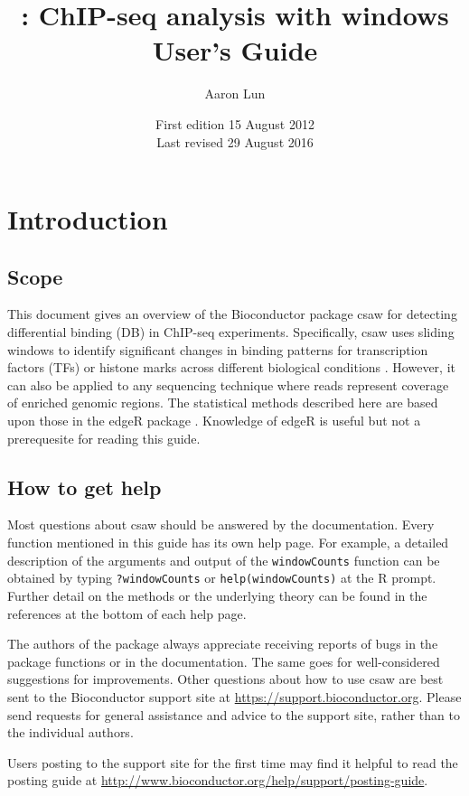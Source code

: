 \documentclass[12pt]{report}
\title{\pkgname{}: ChIP-seq analysis with windows \\ \vspace{0.2in} User's Guide}
\author{Aaron Lun}
\date{First edition 15 August 2012\\
\vspace{6pt}
Last revised 29 August 2016}
\newcommand{\edger}{edgeR}
\newcommand{\pkgname}{csaw}
\newcommand{\code}[1]{{\small\texttt{#1}}}
\newcommand{\R}{\textsf{R}}
\begin{document}
\maketitle
\tableofcontents


\newpage
{}

\chapter{Introduction}
\section{Scope}
This document gives an overview of the Bioconductor package \pkgname{} for detecting differential binding (DB) in ChIP-seq experiments.
Specifically, \pkgname{} uses sliding windows to identify significant changes in binding patterns for transcription factors (TFs) or histone marks across different biological conditions \citep{lun2016csaw}.
However, it can also be applied to any sequencing technique where reads represent coverage of enriched genomic regions.
The statistical methods described here are based upon those in the \edger{} package \citep{robinson2010}. 
Knowledge of \edger{} is useful but not a prerequesite for reading this guide.

\section{How to get help}
Most questions about \pkgname{} should be answered by the documentation. 
Every function mentioned in this guide has its own help page. 
For example, a detailed description of the arguments and output of the \code{windowCounts} function can be obtained by typing \code{?windowCounts} or \code{help(windowCounts)} at the \R{} prompt. 
Further detail on the methods or the underlying theory can be found in the references at the bottom of each help page.

The authors of the package always appreciate receiving reports of bugs in the package functions or in the documentation. 
The same goes for well-considered suggestions for improvements. 
Other questions about how to use \pkgname{} are best sent to the Bioconductor support site at \url{https://support.bioconductor.org}.
Please send requests for general assistance and advice to the support site, rather than to the individual authors. 

Users posting to the support site for the first time may find it helpful to read the posting guide at \url{http://www.bioconductor.org/help/support/posting-guide}.
\end{document}
